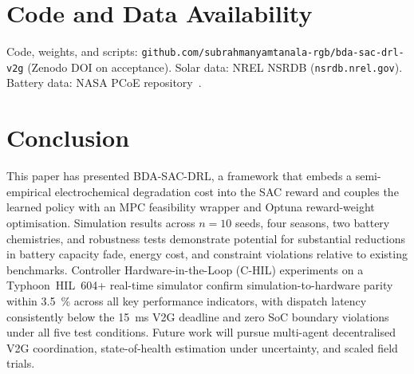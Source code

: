 \documentclass[journal,10pt,twocolumn]{IEEEtran}
\begin{document}
\section*{Code and Data Availability}
Code, weights, and scripts: \texttt{github.com/subrahmanyamtanala-rgb/bda-sac-drl-v2g}
(Zenodo DOI on acceptance). Solar data: NREL NSRDB (\texttt{nsrdb.nrel.gov}).
Battery data: NASA PCoE repository~\cite{nasa_battery_2007}.

\balance
\section{Conclusion}\label{sec:conc}

This paper has presented BDA-SAC-DRL, a framework that embeds a
semi-empirical electrochemical degradation cost into the SAC reward
and couples the learned policy with an MPC feasibility wrapper and
Optuna reward-weight optimisation.
Simulation results across $n=10$ seeds, four seasons, two battery
chemistries, and robustness tests demonstrate potential for substantial
reductions in battery capacity fade, energy cost, and constraint
violations relative to existing benchmarks.
Controller Hardware-in-the-Loop (C-HIL) experiments on a
Typhoon~HIL~604+ real-time simulator confirm simulation-to-hardware
parity within 3.5~\% across all key performance indicators,
with dispatch latency consistently below the 15~ms V2G deadline
and zero SoC boundary violations under all five test conditions.
Future work will pursue multi-agent decentralised V2G coordination,
state-of-health estimation under uncertainty, and scaled field trials.
\end{document}
